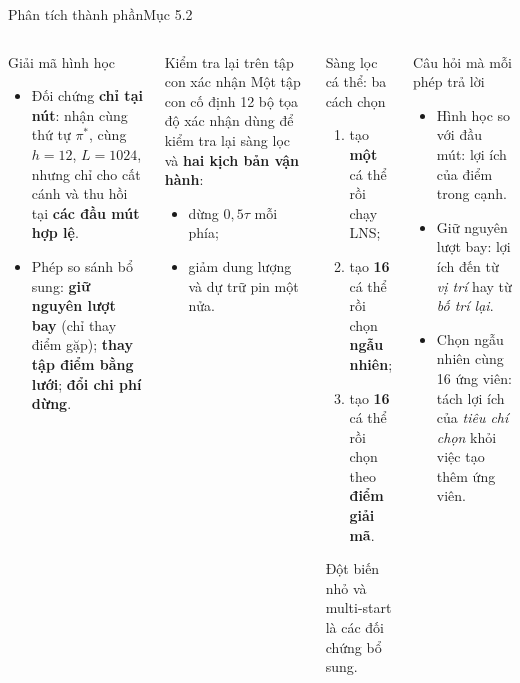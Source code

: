 \documentclass[aspectratio=169,10pt,t,xcolor={table}]{beamer}
\newcommand{\src}[1]{\hfill{\normalfont\footnotesize\color{white!62!navy}#1}}  %
\begin{document}
\begin{frame}{Phân tích thành phần\src{Mục 5.2}}
\begin{columns}[T,onlytextwidth]
\begin{block}{Giải mã hình học}
\scriptsize
\begin{itemize}
\item Đối chứng \textbf{chỉ tại nút}: nhận cùng thứ tự $\pi^*$, cùng $h=12$, $L=1024$, nhưng chỉ cho cất cánh và thu hồi tại \textbf{các đầu mút hợp lệ}.
\item Phép so sánh bổ sung: \textbf{giữ nguyên lượt bay} (chỉ thay điểm gặp); \textbf{thay tập điểm bằng lưới}; \textbf{đổi chi phí dừng}.
\end{itemize}
\end{block}
\begin{block}{Kiểm tra lại trên tập con xác nhận}
\scriptsize Một tập con cố định 12 bộ tọa độ xác nhận dùng để kiểm tra lại sàng lọc và \textbf{hai kịch bản vận hành}:
\begin{itemize}
\item dừng $0{,}5\tau$ mỗi phía;
\item giảm dung lượng và dự trữ pin một nửa.
\end{itemize}
\end{block}
\begin{block}{Sàng lọc cá thể: ba cách chọn}
\scriptsize
\begin{enumerate}
\item tạo \textbf{một} cá thể rồi chạy LNS;
\item tạo \textbf{16} cá thể rồi chọn \textbf{ngẫu nhiên};
\item tạo \textbf{16} cá thể rồi chọn theo \textbf{điểm giải mã}.
\end{enumerate}
Đột biến nhỏ và multi-start là các đối chứng bổ sung.
\end{block}
\begin{exampleblock}{Câu hỏi mà mỗi phép trả lời}
\scriptsize
\begin{itemize}
\item Hình học so với đầu mút: lợi ích của điểm trong cạnh.
\item Giữ nguyên lượt bay: lợi ích đến từ \emph{vị trí} hay từ \emph{bố trí lại}.
\item Chọn ngẫu nhiên cùng 16 ứng viên: tách lợi ích của \emph{tiêu chí chọn} khỏi việc tạo thêm ứng viên.
\end{itemize}
\end{exampleblock}
\end{columns}
\end{frame}
\end{document}
